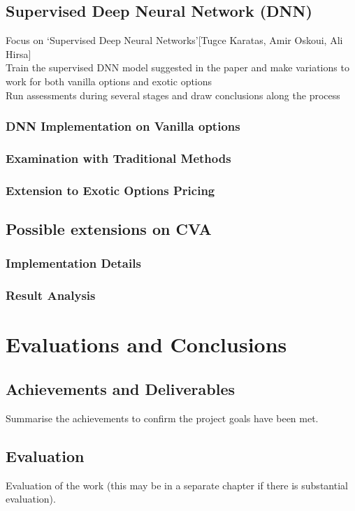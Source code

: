 \documentclass{report}
\begin{document}
\section{Supervised Deep Neural Network (DNN)}
Focus on ‘Supervised Deep Neural Networks’[Tugce Karatas, Amir Oskoui, Ali Hirsa]\\
Train the supervised DNN model suggested in the paper and make variations to work for both vanilla options and exotic options\\
Run assessments during several stages and draw conclusions along the process

\subsection{DNN Implementation on Vanilla options}
\subsection{Examination with Traditional Methods}
\subsection{Extension to Exotic Options Pricing}

\section{Possible extensions on CVA}
\subsection{Implementation Details}
\subsection{Result Analysis}


\chapter{Evaluations and Conclusions}
\section{Achievements and Deliverables}
Summarise the achievements to confirm the project goals have been met.
\section{Evaluation}
Evaluation of the work (this may be in a separate chapter if there is substantial evaluation).
\end{document}
